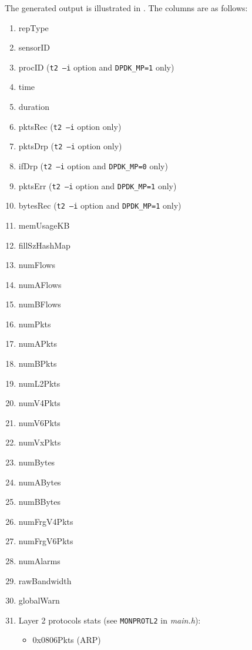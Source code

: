 The generated output is illustrated in .
The columns are as follows:
\begin{multicols}{2}
    \begin{enumerate}
        \item repType
        \item sensorID
        \item procID ({\tt t2 --i} option and {\tt DPDK\_MP=1} only)
        \item time
        \item duration
        \item pktsRec ({\tt t2 --i} option only)
        \item pktsDrp ({\tt t2 --i} option only)
        \item ifDrp ({\tt t2 --i} option and {\tt DPDK\_MP=0} only)
        \item pktsErr ({\tt t2 --i} option and {\tt DPDK\_MP=1} only)
        \item bytesRec ({\tt t2 --i} option and {\tt DPDK\_MP=1} only)
        \item memUsageKB
        \item fillSzHashMap
        \item numFlows
        \item numAFlows
        \item numBFlows
        \item numPkts
        \item numAPkts
        \item numBPkts
        \item numL2Pkts
        \item numV4Pkts
        \item numV6Pkts
        \item numVxPkts
        \item numBytes
        \item numABytes
        \item numBBytes
        \item numFrgV4Pkts
        \item numFrgV6Pkts
        \item numAlarms
        \item rawBandwidth
        \item globalWarn
        \item Layer 2 protocols stats (see {\tt MONPROTL2} in {\em main.h}):
            \begin{itemize}
                \item 0x0806Pkts (ARP)

\end{itemize}
\end{enumerate}
\end{multicols}
